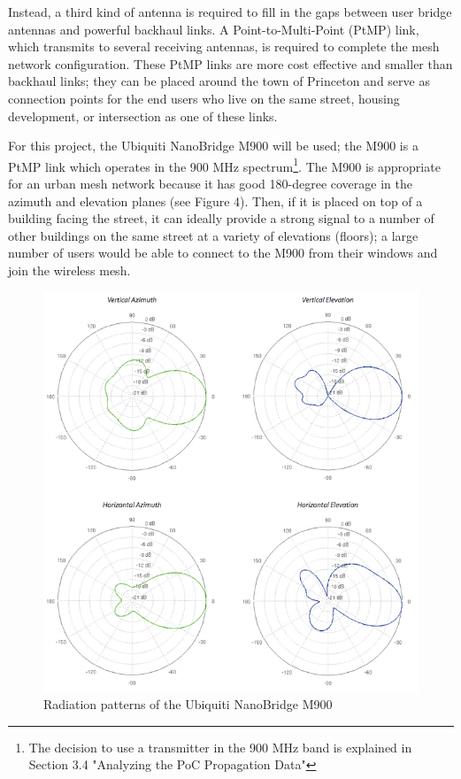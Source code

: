 \documentclass[pageno]{jpaper}
\begin{document}
Instead, a third kind of antenna is required to fill in the gaps between user bridge antennas and powerful backhaul links. A Point-to-Multi-Point (PtMP) link, which transmits to several receiving antennas, is required to complete the mesh network configuration. These PtMP links are more cost effective and smaller than backhaul links; they can be placed around the town of Princeton and serve as connection points for the end users who live on the same street, housing development, or intersection as one of these links.

For this project, the Ubiquiti NanoBridge M900\cite{nanobridge} will be used; the M900 is a PtMP link which operates in the 900 MHz spectrum\footnote{The decision to use a transmitter in the 900 MHz band is explained in Section 3.4 "Analyzing the PoC Propagation Data"}. The M900 is appropriate for an urban mesh network because it has good 180-degree coverage in the azimuth and elevation planes (see Figure 4). Then, if it is placed on top of a building facing the street, it can ideally provide a strong signal to a number of other buildings on the same street at a variety of elevations (floors); a large number of users would be able to connect to the M900 from their windows and join the wireless mesh.

\begin{figure}[h]
	\caption{Radiation patterns of the Ubiquiti NanoBridge M900\cite{nanobridge}}
	\includegraphics{m900_radiation}
	\centering
\end{figure}
\end{document}
